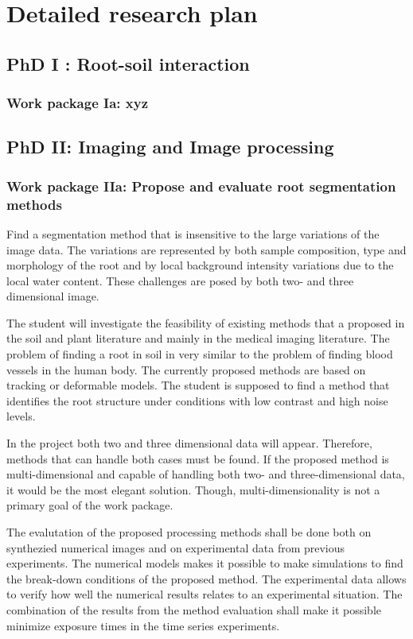 \documentclass[a4paper,11pt]{scrreprt}
\begin{document}
\section{Detailed research plan}
\subsection{PhD I : Root-soil interaction}
\subsubsection{Work package Ia: xyz}
\subsection{PhD II: Imaging and Image processing}

\subsubsection{Work package IIa: Propose and evaluate root segmentation methods}
Find a segmentation method that is insensitive to the large variations of the image data. 
The variations are represented by both sample composition, type and morphology of 
the root and by local background intensity variations due to the local water content. 
These challenges are posed by both two- and three dimensional image. 

The student will investigate the feasibility of existing methods that a proposed 
in the soil and plant literature and mainly in the medical imaging literature. The 
problem of finding a root in soil in very similar to the problem of finding blood 
vessels in the human body. The currently proposed methods are based on tracking or 
deformable models. The student is supposed to find a method that identifies the 
root structure under conditions with low contrast and high noise levels.

In the project both two and three dimensional data will appear. Therefore, methods 
that can handle both cases must be found. If the proposed method is multi-dimensional 
and capable of handling both two- and three-dimensional data, it would be the most 
elegant solution. Though, multi-dimensionality is not a primary goal of the work package.  

The evalutation of the proposed processing methods shall be done both on synthezied 
numerical images and  on experimental data from previous experiments. The numerical 
models makes it possible to make simulations to find the break-down conditions of 
the proposed method. The experimental data allows to verify how well the numerical 
results relates to an experimental situation. The combination of the results from the 
method evaluation shall make it possible minimize exposure times in the time series 
experiments. 
  
\end{document}
